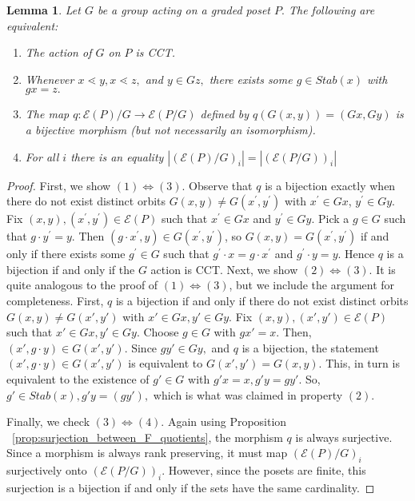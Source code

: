 \documentclass[10 pt]{amsart}
\theoremstyle{plain}
\newtheorem{lem}[thm]{Lemma}
\theoremstyle{definition}
\theoremstyle{remark}
\numberwithin{equation}{section}
\renewcommand{\iff}{\Leftrightarrow}
\begin{document}
\begin{lem}
\label{lem:cover_transitive_equivalence}
Let $G$ be a group acting on a graded poset $P.$ The following are equivalent:
\begin{enumerate}
	\item The action of $G$ on $P$ is CCT.
	\item Whenever $x \lessdot y,x \lessdot z,$ and $y \in Gz,$ there exists some $g \in Stab(x)$ with $gx = z.$
	\item The map $q\colon \mathcal E(P)/G\rightarrow \mathcal E(P/G)$ defined by $q(G(x, y)) = (Gx,Gy)$ is a bijective morphism (but not necessarily an isomorphism).
	\item For all $i$ there is an equality $|(\mathcal E(P)/G)_i|=| (\mathcal E(P/G))_i|$
\end{enumerate}
\end{lem}
\begin{proof}
First, we show $(1) \iff (3)$. Observe that $q$ is a bijection exactly when there do not exist distinct orbits $G(x, y) \ne G(x^\prime, y^\prime)$ with $x^\prime\in Gx$, $y^\prime\in Gy$.  Fix $(x, y), (x^\prime, y^\prime)\in \mathcal E(P)$ such that $x^\prime\in Gx$ and $y^\prime\in Gy$.  Pick a $g\in G$ such that $g\cdot y^\prime = y$.  Then $(g\cdot x^\prime, y)\in G(x^\prime, y^\prime)$, so $G(x, y) = G(x^\prime, y^\prime)$ if and only if there exists some $g^\prime\in G$ such that $g^\prime\cdot x = g\cdot x^\prime$ and $g^\prime\cdot y = y$. Hence $q$ is a bijection if and only if the $G$ action is CCT.
Next, we show $(2) \iff (3)$. It is quite analogous to the proof of $(1) \iff (3)$, but we include the argument for completeness. 
First, $q$ is a bijection if and only if there do not exist distinct orbits $G(x, y) \neq G(x', y')$ with $x' \in Gx,y'\in Gy.$ Fix $(x, y),(x', y') \in \mathcal E(P)$ such that $x' \in Gx,y'\in Gy$. Choose $g \in G$ with $gx' = x.$ Then, $(x', g\cdot y) \in G(x', y').$ Since $g y' \in Gy,$ and $q$ is a bijection, the statement $(x' , g\cdot y) \in G(x', y')$ is equivalent to $G(x', y') = G(x, y).$ This, in turn is equivalent to the existence of $g' \in G$ with $g'x = x,g'y = gy'.$ So, $g' \in Stab(x),g'y = (gy'),$ which is what was claimed in property $(2)$.


Finally, we check $(3)\iff (4).$ Again using Proposition ~\ref{prop:surjection_between_F_quotients}, the morphism $q$ is always surjective. Since a morphism is always rank preserving, it must map $(\mathcal E(P)/G)_i$ surjectively onto $(\mathcal E(P/G))_i.$ However, since the posets are finite, this surjection is a bijection if and only if the sets have the same cardinality.
\end{proof}
\end{document}
